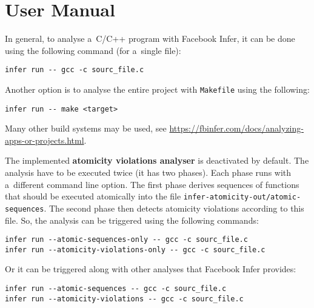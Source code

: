 \section*{User Manual}

In general, to analyse a~C/C++ program with Facebook Infer, it can be
done using the following command (for a~single file):
\begin{lstlisting}[style=bash]
infer run -- gcc -c sourc_file.c
\end{lstlisting}
Another option is to analyse the entire project with \texttt{Makefile} using
the following:
\begin{lstlisting}[style=bash]
infer run -- make <target>
\end{lstlisting}
Many other build systems may be used, see
\url{https://fbinfer.com/docs/analyzing-apps-or-projects.html}.

The implemented \textbf{atomicity violations analyser} is deactivated
by default. The analysis have to be executed twice (it has two phases).
Each phase runs with a~different command line option. The first phase
derives sequences of functions that should be executed atomically into
the file \texttt{infer-atomicity-out/atomic-sequences}. The second phase
then detects atomicity violations according to this file. So, the analysis
can be triggered using the following commands:
\begin{lstlisting}[style=bash]
infer run --atomic-sequences-only -- gcc -c sourc_file.c
infer run --atomicity-violations-only -- gcc -c sourc_file.c
\end{lstlisting}
Or it can be triggered along with other analyses that Facebook Infer provides:
\begin{lstlisting}[style=bash]
infer run --atomic-sequences -- gcc -c sourc_file.c
infer run --atomicity-violations -- gcc -c sourc_file.c
\end{lstlisting}


